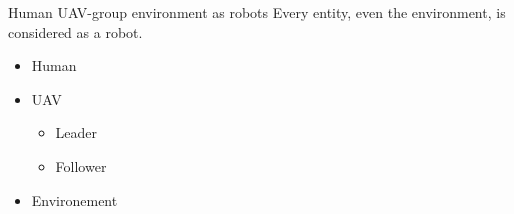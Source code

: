 \begin{frame}[allowframebreaks]{Human UAV-group environment as robots}
    Every entity, even the environment, is considered as a robot.
    \begin{itemize}
        \item Human
        \item UAV
        \begin{itemize}
            \item Leader
            \item Follower
        \end{itemize}
        \item Environement
    \end{itemize}

\end{frame}